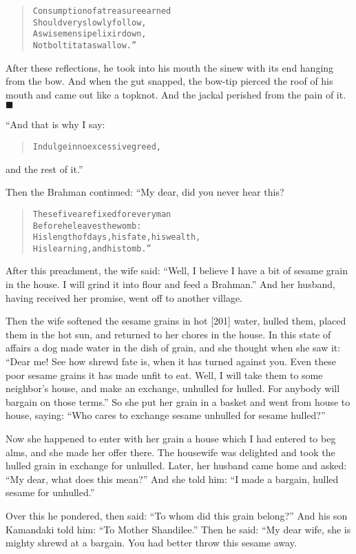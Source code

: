 \documentclass[article, twoside, 14pt]{memoir}
\newcommand{\qed}{\hfill \ensuremath{\blacksquare}}
\renewenvironment{verbatim}{%
\begin{quote}%
\vskip -10pt%
\begin{alltt}\normalfont\large}{\end{alltt}%
\end{quote}%
\vskip -10pt
} %
\begin{document}
\begin{verbatim}
Consumption of a treasure earned
    Should very slowly follow,
As wise men sip elixir down,
    Not bolt it at a swallow.”
\end{verbatim}
After these reflections, he took into his mouth the sinew with its
end hanging from the bow. And when the gut snapped, the bow-tip
pierced the roof of his mouth and came out like a topknot. And the
jackal perished from the pain of it.\hyperref[s40]{\qed}

“And that is why I say:

\begin{verbatim}
Indulge in no excessive greed,
\end{verbatim}
and the rest of it.”

Then the Brahman continued: “My dear, did you never hear this?

\begin{verbatim}
These five are fixed for every man
    Before he leaves the womb:
His length of days, his fate, his wealth,
    His learning, and his tomb.”
\end{verbatim}
After this preachment, the wife said:
``Well, I believe I have a bit of sesame grain in the house. I will grind it into flour and feed a Brahman.''
And her husband, having received her promise, went off to another
village.

Then the wife softened the sesame grains in hot [201] water, hulled
them, placed them in the hot sun, and returned to her chores in the
house. In this state of affairs a dog made water in the dish of
grain, and she thought when she saw it:
``Dear me! See how shrewd fate is, when it has turned against you. Even these poor sesame grains it has made unfit to eat. Well, I will take them to some neighbor's house, and make an exchange, unhulled for hulled. For anybody will bargain on those terms.''
So she put her grain in a basket and went from house to house,
saying:
``Who cares to exchange sesame unhulled for sesame hulled?''

Now she happened to enter with her grain a house which I had
entered to beg alms, and she made her offer there. The housewife
was delighted and took the hulled grain in exchange for unhulled.
Later, her husband came home and asked:
``My dear, what does this mean?'' And she told him:
``I made a bargain, hulled sesame for unhulled.''

Over this he pondered, then said:
``To whom did this grain belong?'' And his son Kamandaki told him:
``To Mother Shandilee.'' Then he said: “My dear wife, she is mighty
shrewd at a bargain. You had better throw this sesame away.
\end{document}
